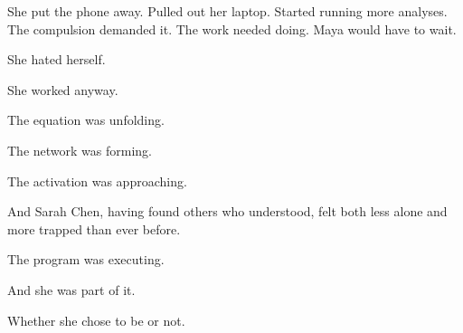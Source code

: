 She put the phone away. Pulled out her laptop. Started running more analyses. The compulsion demanded it. The work needed doing. Maya would have to wait.

She hated herself.

She worked anyway.

The equation was unfolding.

The network was forming.

The activation was approaching.

And Sarah Chen, having found others who understood, felt both less alone and more trapped than ever before.

The program was executing.

And she was part of it.

Whether she chose to be or not.

